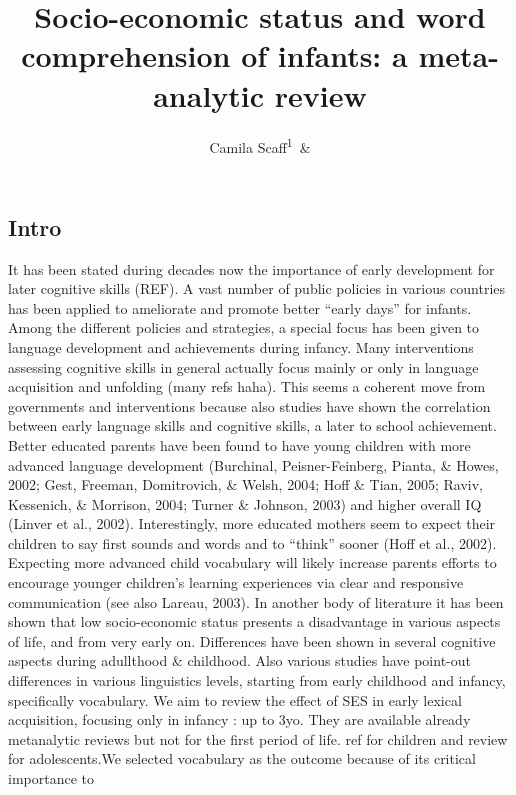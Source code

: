 \documentclass[english,man]{apa6}
\title{Socio-economic status and word comprehension of infants: a meta-analytic
review}
\author{Camila Scaff\textsuperscript{1}~\&}
\theoremstyle{definition}
\theoremstyle{definition}
\theoremstyle{definition}
\theoremstyle{remark}
\begin{document}
\maketitle

\setcounter{secnumdepth}{0}



\subsection{Intro}\label{intro}

It has been stated during decades now the importance of early
development for later cognitive skills (REF). A vast number of public
policies in various countries has been applied to ameliorate and promote
better \enquote{early days} for infants. Among the different policies
and strategies, a special focus has been given to language development
and achievements during infancy. Many interventions assessing cognitive
skills in general actually focus mainly or only in language acquisition
and unfolding (many refs haha). This seems a coherent move from
governments and interventions because also studies have shown the
correlation between early language skills and cognitive skills, a later
to school achievement. Better educated parents have been found to have
young children with more advanced language development (Burchinal,
Peisner-Feinberg, Pianta, \& Howes, 2002; Gest, Freeman, Domitrovich, \&
Welsh, 2004; Hoff \& Tian, 2005; Raviv, Kessenich, \& Morrison, 2004;
Turner \& Johnson, 2003) and higher overall IQ (Linver et al., 2002).
Interestingly, more educated mothers seem to expect their children to
say first sounds and words and to \enquote{think} sooner (Hoff et al.,
2002). Expecting more advanced child vocabulary will likely increase
parents efforts to encourage younger children's learning experiences via
clear and responsive communication (see also Lareau, 2003). In another
body of literature it has been shown that low socio-economic status
presents a disadvantage in various aspects of life, and from very early
on. Differences have been shown in several cognitive aspects during
adullthood \& childhood. Also various studies have point-out differences
in various linguistics levels, starting from early childhood and
infancy, specifically vocabulary. We aim to review the effect of SES in
early lexical acquisition, focusing only in infancy : up to 3yo. They
are available already metanalytic reviews but not for the first period
of life. ref for children and review for adolescents.We selected
vocabulary as the outcome because of its critical importance to
\end{document}
